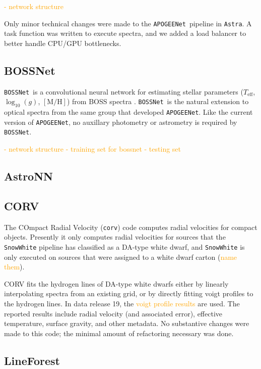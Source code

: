 \documentclass[modern]{aastex631}
\newcommand{\astra}{\texttt{Astra}}
\newcommand{\Astra}{\astra}
\newcommand{\pipeline}[1]{\texttt{#1}}
\newcommand{\APOGEENet}{\pipeline{APOGEENet}}
\newcommand{\BOSSNet}{\pipeline{BOSSNet}}
\newcommand{\todo}[1]{\textcolor{orange}{#1}}
\newcommand{\teff}{T_\mathrm{eff}}
\newcommand{\logg}{\log_{10}(g)}
\newcommand{\mh}{[\mathrm{M/H}]}
\begin{document}
\todo{- network structure}

Only minor technical changes were made to the \APOGEENet\ pipeline in \Astra. A task function was written to execute spectra, and we added a load balancer to better handle CPU/GPU bottlenecks.

\subsection{BOSSNet} \label{sec:methods-boss-net}

\BOSSNet\ is a convolutional neural network for estimating stellar parameters ($\teff$, $\logg$, $\mh$) from BOSS spectra \citep{bossnet}. \BOSSNet\ is the natural extension to optical spectra from the same group that developed \APOGEENet. Like the current version of \APOGEENet, no auxillary photometry or astrometry is required by \BOSSNet.

\todo{
- network structure
- training set for bossnet
- testing set
}

\subsection{AstroNN} \label{sec:methods-astro-nn}

\subsection{CORV}

The COmpact Radial Velocity (\texttt{corv}) code computes radial velocities for compact objects. Presently it only computes radial velocities for sources that the \texttt{SnowWhite} pipeline has classified as a DA-type white dwarf, and \texttt{SnowWhite} is only executed on sources that were assigned to a white dwarf carton (\todo{name them}).

CORV fits the hydrogen lines of DA-type white dwarfs either by linearly interpolating spectra from an existing grid, or by directly fitting voigt profiles to the hydrogen lines. In data release 19, the \todo{voigt profile results} are used. The reported results include radial velocity (and associated error), effective temperature, surface gravity, and other metadata. No substantive changes were made to this code; the minimal amount of refactoring necessary was done.

\subsection{LineForest} \label{sec:methods-line-forest}
\end{document}
